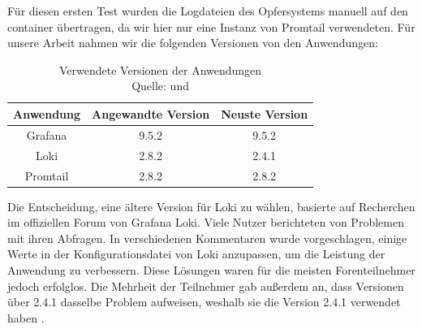 
Für diesen ersten Test wurden die Logdateien des Opfersystems manuell auf den \gls{container} übertragen, da wir hier nur eine Instanz von Promtail verwendeten.  Für unsere Arbeit nahmen wir die folgenden Versionen von den Anwendungen:
\begin{table}[h]
   \centering
   \begin{tabular}{|c|c|c|}
   \hline
   \textbf{Anwendung}  & \textbf{Angewandte Version} & \textbf{Neuste Version}    \\ \hline
   Grafana             & \cellcolor{green!25}9.5.2   & \cellcolor{green!25}9.5.2 \\ \hline
   Loki                & \cellcolor{green!25}2.8.2   & \cellcolor{red!25}2.4.1 \\ \hline
   Promtail            & \cellcolor{green!25}2.8.2    & \cellcolor{green!25}2.8.2\\ \hline
   \end{tabular}
   \caption[Verwendete Versionen der Anwendungen]
   {Verwendete Versionen der Anwendungen \\Quelle: \citep{Grafana_Version} und \citep{GrafanaLoki_Version}}
   \label{tab:Versions}
\end{table}

Die Entscheidung, eine ältere Version für Loki zu wählen, basierte auf Recherchen im offiziellen Forum von Grafana Loki. Viele Nutzer berichteten von Problemen mit ihren Abfragen. In verschiedenen Kommentaren wurde vorgeschlagen, einige Werte in der Konfigurationsdatei von Loki anzupassen, um die Leistung der Anwendung zu verbessern. Diese Lösungen waren für die meisten Forenteilnehmer jedoch erfolglos. Die Mehrheit der Teilnehmer gab außerdem an, dass Versionen über 2.4.1 dasselbe Problem aufweisen, weshalb sie die Version 2.4.1 verwendet haben \citep{githubforum}.

